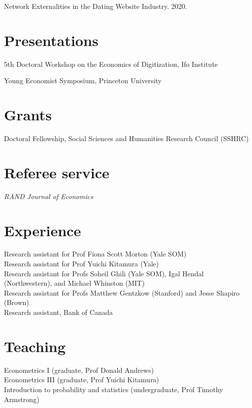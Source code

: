 \documentclass[11pt]{article} %
\begin{document}
\medskip
Network Externalities in the Dating Website Industry. 2020.


\section*{Presentations}

 5th Doctoral Workshop on the Economics of Digitization, Ifo Institute

 Young Economist Symposium, Princeton University

\section*{Grants}

 Doctoral Fellowship, Social Sciences and Humanities Research Council (SSHRC)


\section*{Referee service}

\textit{RAND Journal of Economics}

\section*{Experience}

 Research assistant for Prof Fiona Scott Morton (Yale SOM)  \\
 Research assistant for Prof Yuichi Kitamura (Yale) \\
 Research assistant for Profs Soheil Ghili (Yale SOM), Igal Hendal (Northwestern), and Michael Whinston (MIT) \\
  Research assistant for Profs Matthew Gentzkow (Stanford) and Jesse Shapiro (Brown) \\
 Research assistant, Bank of Canada \\

\section*{Teaching}

 Econometrics I (graduate, Prof Donald Andrews) \\
 Econometrics III (graduate, Prof Yuichi Kitamura) \\
 Introduction to probability and statistics (undergraduate, Prof Timothy Armstrong)




\vfill %
\end{document}
